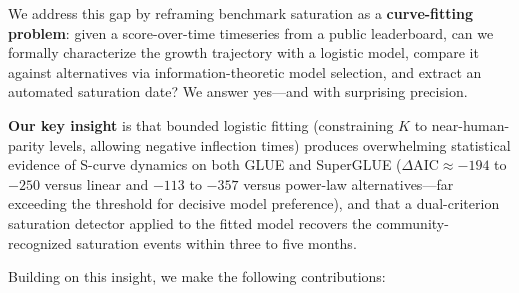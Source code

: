 We address this gap by reframing benchmark saturation as a \textbf{curve-fitting problem}: given a score-over-time timeseries from a public leaderboard, can we formally characterize the growth trajectory with a logistic model, compare it against alternatives via information-theoretic model selection, and extract an automated saturation date?
We answer yes---and with surprising precision.

\textbf{Our key insight} is that bounded logistic fitting (constraining $K$ to near-human-parity levels, allowing negative inflection times) produces overwhelming statistical evidence of S-curve dynamics on both GLUE and SuperGLUE ($\Delta\text{AIC} \approx -194$ to $-250$ versus linear and $-113$ to $-357$ versus power-law alternatives---far exceeding the \citet{burnham2002model} threshold for decisive model preference), and that a dual-criterion saturation detector applied to the fitted model recovers the community-recognized saturation events within three to five months.

Building on this insight, we make the following contributions:

